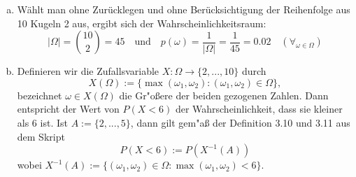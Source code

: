 \documentclass[10pt, oneside]{article}
\begin{document}
\begin{enumerate}[(a)]
    \item Wählt man ohne Zurücklegen und ohne Berücksichtigung der Reihenfolge
        aus 10 Kugeln 2 aus, ergibt sich der Wahrscheinlichkeitsraum:
        \begin{equation*}
            |\Omega| = \binom{10}{2} = 45 \quad\text{und}\quad p(\omega) = \dfrac{1}{|\Omega|} = \dfrac{1}{45} = 0.02 \quad (\forall_{\omega \in \Omega})
        \end{equation*}
    \item Definieren wir die Zufallsvariable $X: \Omega \rightarrow \{2,...,10\}$ durch
        \begin{equation*}
            X(\Omega) := \{\max(\omega_1, \omega_2) : (\omega_1, \omega_2) \in \Omega\},
        \end{equation*}
        bezeichnet $\omega \in X(\Omega)$ die Gr"o{\ss}ere der beiden gezogenen
        Zahlen. Dann entspricht der Wert von $P(X < 6)$ der Wahrscheinlichkeit,
        dass sie kleiner als 6 ist. Ist $A := \{2,...,5\}$, dann gilt
        gem"a{\ss} der Definition 3.10 und 3.11 aus dem Skript
        \begin{equation*}
            P(X < 6) := P(X^{-1}(A))
        \end{equation*}
        wobei $X^{-1}(A) := \{(\omega_1, \omega_2) \in \Omega : \max(\omega_1, \omega_2) < 6\}$.


\end{enumerate}
\end{document}
